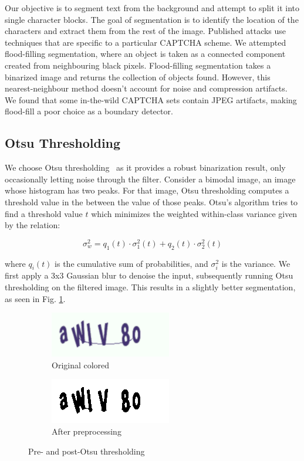 \documentclass[twocolumn,10pt]{article}
\begin{document}
Our objective is to segment text from the background and attempt to split it into single character blocks. The goal of segmentation is to identify the location of the characters and extract them from the rest of the image. Published attacks use techniques that are specific to a particular CAPTCHA scheme. We attempted flood-filling segmentation, where an object is taken as a connected component created from neighbouring black pixels. Flood-filling segmentation takes a binarized image and returns the collection of objects found. However, this nearest-neighbour method doesn’t account for noise and compression artifacts. We found that some in-the-wild CAPTCHA sets contain JPEG artifacts, making flood-fill a poor choice as a boundary detector.

\subsection{Otsu Thresholding}
We choose Otsu thresholding~\cite{otsu} as it provides a robust binarization result, only occasionally letting noise through the filter. Consider a bimodal image, an image whose histogram has two peaks. For that image, Otsu thresholding computes a threshold value in the between the value of those peaks. Otsu's algorithm tries to find a threshold value $t$ which minimizes the weighted within-class variance given by the relation:
 
\begin{equation}
  \sigma^2_w = q_1(t) \cdot \sigma_1^2(t) + q_2(t) \cdot \sigma_2^2(t)
\end{equation}

where $q_i(t)$ is the cumulative sum of probabilities, and $\sigma_i^2$ is the variance. We first apply a 3x3 Gaussian blur to denoise the input, subsequently running Otsu thresholding on the filtered image. This results in a slightly better segmentation, as seen in Fig. \ref{fig:otsu}.

\begin{center}
\begin{figure}
\centering
\begin{subfigure}{.5\columnwidth}
  \centering
  \includegraphics[width=.4\linewidth]{0_aWlV8o_original.png}
  \caption{Original colored}
\end{subfigure}%
\begin{subfigure}{.5\columnwidth}
  \centering
  \includegraphics[width=.4\linewidth]{0_aWlV8o.png}
  \caption{After preprocessing}
\end{subfigure}
\caption{Pre- and post-Otsu thresholding}
\label{fig:otsu}
\end{figure}
\end{center}
 
\end{document}
